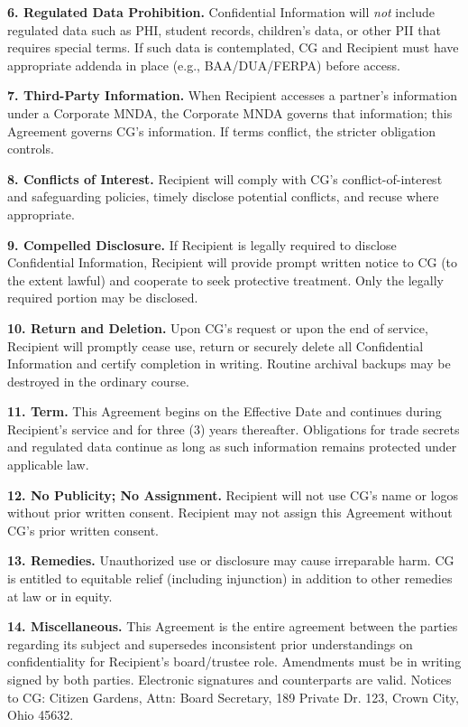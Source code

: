 \documentclass[11pt]{article}
\begin{document}
\textbf{6. Regulated Data Prohibition.} Confidential Information will \emph{not} include regulated data such as PHI, student records, children’s data, or other PII that requires special terms. If such data is contemplated, CG and Recipient must have appropriate addenda in place (e.g., BAA/DUA/FERPA) before access.

\textbf{7. Third-Party Information.} When Recipient accesses a partner’s information under a Corporate MNDA, the Corporate MNDA governs that information; this Agreement governs CG’s information. If terms conflict, the stricter obligation controls.

\textbf{8. Conflicts of Interest.} Recipient will comply with CG’s conflict-of-interest and safeguarding policies, timely disclose potential conflicts, and recuse where appropriate.

\textbf{9. Compelled Disclosure.} If Recipient is legally required to disclose Confidential Information, Recipient will provide prompt written notice to CG (to the extent lawful) and cooperate to seek protective treatment. Only the legally required portion may be disclosed.

\textbf{10. Return and Deletion.} Upon CG’s request or upon the end of service, Recipient will promptly cease use, return or securely delete all Confidential Information and certify completion in writing. Routine archival backups may be destroyed in the ordinary course.

\textbf{11. Term.} This Agreement begins on the Effective Date and continues during Recipient’s service and for three (3) years thereafter. Obligations for trade secrets and regulated data continue as long as such information remains protected under applicable law.

\textbf{12. No Publicity; No Assignment.} Recipient will not use CG’s name or logos without prior written consent. Recipient may not assign this Agreement without CG’s prior written consent.

\textbf{13. Remedies.} Unauthorized use or disclosure may cause irreparable harm. CG is entitled to equitable relief (including injunction) in addition to other remedies at law or in equity.

\textbf{14. Miscellaneous.} This Agreement is the entire agreement between the parties regarding its subject and supersedes inconsistent prior understandings on confidentiality for Recipient’s board/trustee role. Amendments must be in writing signed by both parties. Electronic signatures and counterparts are valid. Notices to CG: Citizen Gardens, Attn: Board Secretary, 189 Private Dr. 123, Crown City, Ohio 45632.
\end{document}

